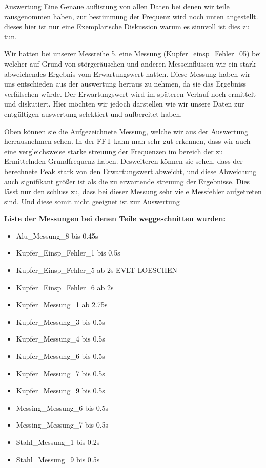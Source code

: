 \documentclass[twoside]{protokoll}
\begin{document}
\begin{aufgabe}{Auswertung}
Eine Genaue auflistung von allen Daten bei denen wir teile rausgenommen haben, zur bestimmung der Frequenz wird noch unten angestellt. dieses hier ist nur eine Exemplarische Diskussion warum es sinnvoll ist dies zu tun.

Wir hatten bei unserer Messreihe 5. eine Messung (Kupfer\_einsp\_Fehler\_05) bei welcher auf Grund von störgeräuschen und anderen Messeinflüssen wir ein stark abweichendes Ergebnis vom Erwartungswert hatten. Diese Messung haben wir uns entschieden aus der auswertung herraus zu nehmen, da sie das Ergebniss verfälschen würde. Der Erwartungswert wird im späteren Verlauf noch ermittelt und diskutiert. Hier möchten wir jedoch darstellen wie wir unsere Daten zur entgültigen auswertung selektiert und aufbereitet haben.


Oben können sie die Aufgezeichnete Messung, welche wir aus der Auswertung herrausnehmen sehen. In der FFT kann man sehr gut erkennen, dass wir auch eine vergleichsweise starke streuung der Frequenzen im bereich der zu Ermittelnden Grundfrequenz haben. Desweiteren können sie sehen, dass der berechnete Peak stark von den Erwartungswert abweicht, und diese Abweichung auch signifikant größer ist als die zu erwartende streuung der Ergebnisse. Dies lässt nur den schluss zu, dass bei dieser Messung sehr viele Messfehler aufgetreten sind. Und diese somit nicht geeignet ist zur Auswertung

\textbf{Liste der Messungen bei denen Teile weggeschnitten wurden:}
\begin{itemize}
\item Alu\_Messung\_8 bis 0.45s
\item Kupfer\_Einsp\_Fehler\_1 bis 0.5s
\item Kupfer\_Einsp\_Fehler\_5 ab 2s EVLT LOESCHEN
\item Kupfer\_Einsp\_Fehler\_6 ab 2s
\item Kupfer\_Messung\_1 ab 2.75s
\item Kupfer\_Messung\_3 bis 0.5s
\item Kupfer\_Messung\_4 bis 0.5s
\item Kupfer\_Messung\_6 bis 0.5s
\item Kupfer\_Messung\_7 bis 0.5s
\item Kupfer\_Messung\_9 bis 0.5s
\item Messing\_Messung\_6 bis 0.5s
\item Messing\_Messung\_7 bis 0.5s
\item Stahl\_Messung\_1 bis 0.2s
\item Stahl\_Messung\_9 bis 0.5s
\end{itemize}



\end{aufgabe}
\end{document}
